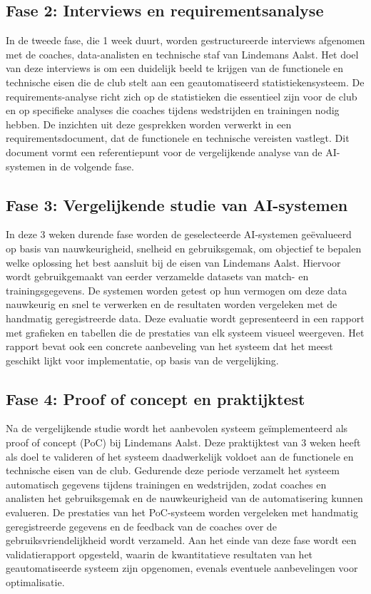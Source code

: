 \subsection{Fase 2: Interviews en requirementsanalyse}
In de tweede fase, die 1 week duurt, worden gestructureerde interviews afgenomen met de coaches, data-analisten en technische staf van Lindemans Aalst. Het doel van deze interviews is om een duidelijk beeld te krijgen van de functionele en technische eisen die de club stelt aan een geautomatiseerd statistiekensysteem. De requirements-analyse richt zich op de statistieken die essentieel zijn voor de club en op specifieke analyses die coaches tijdens wedstrijden en trainingen nodig hebben. De inzichten uit deze gesprekken worden verwerkt in een requirementsdocument, dat de functionele en technische vereisten vastlegt. Dit document vormt een referentiepunt voor de vergelijkende analyse van de AI-systemen in de volgende fase.
\subsection{Fase 3: Vergelijkende studie van AI-systemen}
In deze 3 weken durende fase worden de geselecteerde AI-systemen geëvalueerd op basis van nauwkeurigheid, snelheid en gebruiksgemak, om objectief te bepalen welke oplossing het best aansluit bij de eisen van Lindemans Aalst. Hiervoor wordt gebruikgemaakt van eerder verzamelde datasets van match- en trainingsgegevens. De systemen worden getest op hun vermogen om deze data nauwkeurig en snel te verwerken en de resultaten worden vergeleken met de handmatig geregistreerde data. Deze evaluatie wordt gepresenteerd in een rapport met grafieken en tabellen die de prestaties van elk systeem visueel weergeven. Het rapport bevat ook een concrete aanbeveling van het systeem dat het meest geschikt lijkt voor implementatie, op basis van de vergelijking.
\subsection{Fase 4: Proof of concept en praktijktest}
Na de vergelijkende studie wordt het aanbevolen systeem geïmplementeerd als proof of concept (PoC) bij Lindemans Aalst. Deze praktijktest van 3 weken heeft als doel te valideren of het systeem daadwerkelijk voldoet aan de functionele en technische eisen van de club. Gedurende deze periode verzamelt het systeem automatisch gegevens tijdens trainingen en wedstrijden, zodat coaches en analisten het gebruiksgemak en de nauwkeurigheid van de automatisering kunnen evalueren. De prestaties van het PoC-systeem worden vergeleken met handmatig geregistreerde gegevens en de feedback van de coaches over de gebruiksvriendelijkheid wordt verzameld. Aan het einde van deze fase wordt een validatierapport opgesteld, waarin de kwantitatieve resultaten van het geautomatiseerde systeem zijn opgenomen, evenals eventuele aanbevelingen voor optimalisatie.
